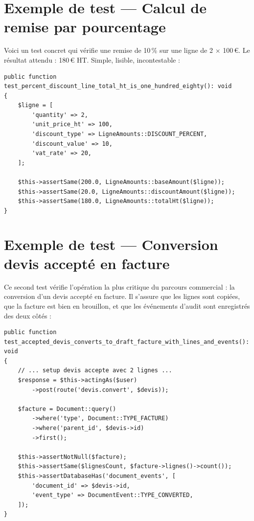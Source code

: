 \documentclass[12pt,a4paper]{report}
\begin{document}
\section{Exemple de test — Calcul de remise par pourcentage}

Voici un test concret qui vérifie une remise de 10\,\% sur une ligne de 2 $\times$ 100\,€. Le résultat attendu : 180\,€ HT. Simple, lisible, incontestable :

\begin{lstlisting}[style=phpstyle,caption={DocumentTotalsTest — Validation remise 10\% sur ligne}]
public function test_percent_discount_line_total_ht_is_one_hundred_eighty(): void
{
    $ligne = [
        'quantity' => 2,
        'unit_price_ht' => 100,
        'discount_type' => LigneAmounts::DISCOUNT_PERCENT,
        'discount_value' => 10,
        'vat_rate' => 20,
    ];

    $this->assertSame(200.0, LigneAmounts::baseAmount($ligne));
    $this->assertSame(20.0, LigneAmounts::discountAmount($ligne));
    $this->assertSame(180.0, LigneAmounts::totalHt($ligne));
}
\end{lstlisting}

\section{Exemple de test — Conversion devis accepté en facture}

Ce second test vérifie l'opération la plus critique du parcours commercial : la conversion d'un devis accepté en facture. Il s'assure que les lignes sont copiées, que la facture est bien en brouillon, et que les événements d'audit sont enregistrés des deux côtés :

\begin{lstlisting}[style=phpstyle,caption={DevisConversionTest — Conversion atomique avec événements d'audit}]
public function test_accepted_devis_converts_to_draft_facture_with_lines_and_events(): void
{
    // ... setup devis accepte avec 2 lignes ...
    $response = $this->actingAs($user)
        ->post(route('devis.convert', $devis));

    $facture = Document::query()
        ->where('type', Document::TYPE_FACTURE)
        ->where('parent_id', $devis->id)
        ->first();

    $this->assertNotNull($facture);
    $this->assertSame($lignesCount, $facture->lignes()->count());
    $this->assertDatabaseHas('document_events', [
        'document_id' => $devis->id,
        'event_type' => DocumentEvent::TYPE_CONVERTED,
    ]);
}
\end{lstlisting}
\end{document}
